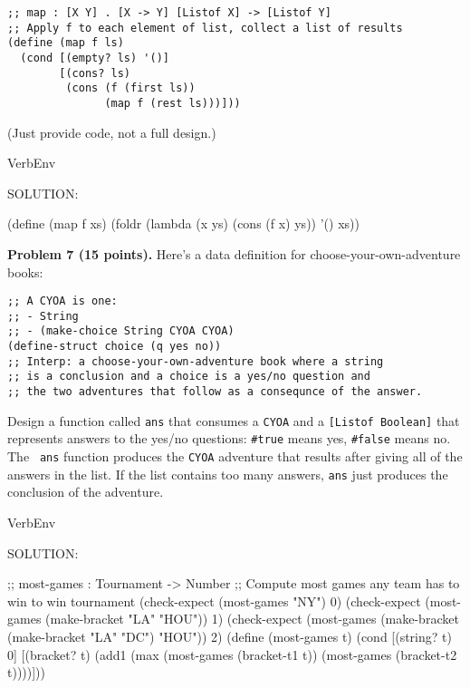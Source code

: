 \documentclass[12pt]{article}
\begin{document}
\begin{verbatim}
;; map : [X Y] . [X -> Y] [Listof X] -> [Listof Y]
;; Apply f to each element of list, collect a list of results
(define (map f ls)
  (cond [(empty? ls) '()]
        [(cons? ls)
         (cons (f (first ls))
               (map f (rest ls)))]))
\end{verbatim}

\noindent
(Just provide code, not a full design.)

\begin{SaveVerbatim}{VerbEnv}


SOLUTION:

(define (map f xs)
  (foldr (lambda (x ys) (cons (f x) ys)) '() xs))
\end{SaveVerbatim}



\newpage

\noindent
{\bf Problem 7 (15 points).}
%
Here's a data definition for choose-your-own-adventure books:
\begin{verbatim}
;; A CYOA is one:
;; - String
;; - (make-choice String CYOA CYOA)
(define-struct choice (q yes no))
;; Interp: a choose-your-own-adventure book where a string
;; is a conclusion and a choice is a yes/no question and
;; the two adventures that follow as a consequnce of the answer.
\end{verbatim}

\noindent
Design a function called {\tt ans} that consumes a {\tt CYOA} and a
{\tt [Listof Boolean]} that represents answers to the yes/no
questions: {\tt \#true} means yes, {\tt \#false} means no.  The {\tt
  ans} function produces the {\tt CYOA} adventure that results after
giving all of the answers in the list.  If the list contains too many
answers, {\tt ans} just produces the conclusion of the adventure.


\begin{SaveVerbatim}{VerbEnv}

SOLUTION:

;; most-games : Tournament -> Number
;; Compute most games any team has to win to win tournament
(check-expect (most-games "NY") 0)
(check-expect (most-games (make-bracket "LA" "HOU")) 1)
(check-expect (most-games (make-bracket (make-bracket "LA" "DC") "HOU")) 2)
(define (most-games t)
  (cond [(string? t) 0]
        [(bracket? t)
         (add1 (max (most-games (bracket-t1 t))
                    (most-games (bracket-t2 t))))]))
\end{SaveVerbatim}

\end{document}
